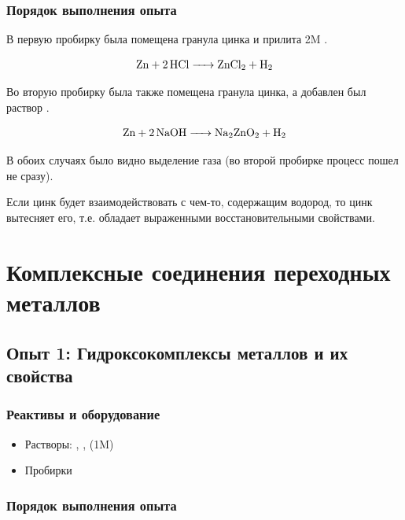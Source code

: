 \documentclass[a4paper, 12pt]{article}
\begin{document}
\subsubsection{Порядок выполнения опыта}

В первую пробирку была помещена гранула цинка и прилита 2M .

\begin{equation}
	\ce{Zn + 2HCl -> ZnCl2 + H2}
\end{equation}

Во вторую пробирку была также помещена гранула цинка, а добавлен был раствор .

\begin{equation}
	\ce{Zn + 2NaOH -> Na2ZnO2 + H2}
\end{equation}

В обоих случаях было видно выделение газа (во второй пробирке процесс пошел не сразу).

Если цинк будет взаимодействовать с чем-то, содержащим водород, то цинк вытесняет его, т.е. обладает выраженными восстановительными свойствами.

\newpage

\section{Комплексные соединения переходных металлов}


\subsection{Опыт 1: Гидроксокомплексы металлов и их свойства}

\subsubsection{Реактивы и оборудование}

\begin{itemize}
	\item Растворы: , ,  (1M)
	
	\item Пробирки
\end{itemize}

\subsubsection{Порядок выполнения опыта}
\end{document}
